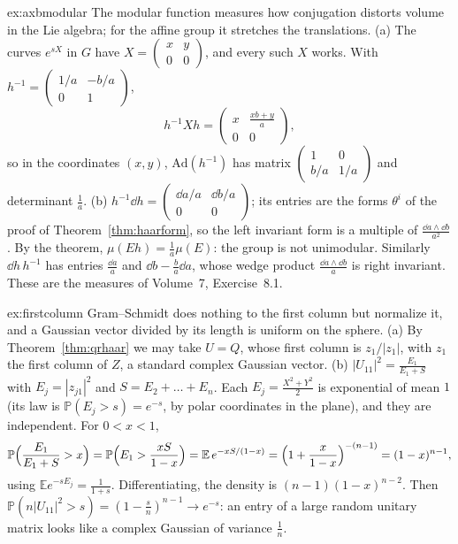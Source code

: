 \begin{solution}{ex:axbmodular}
\idea The modular function measures how conjugation distorts volume in the Lie algebra; for the affine group it stretches the translations.
\writeup (a) The curves $e^{sX}$ in $G$ have $X=\begin{pmatrix}x&y\\0&0\end{pmatrix}$, and every such $X$ works. With $h^{-1}=\begin{pmatrix}1/a&-b/a\\0&1\end{pmatrix}$,
\[h^{-1}Xh=\begin{pmatrix}x&\frac{xb+y}a\\0&0\end{pmatrix},\]
so in the coordinates $(x,y)$, $\mathrm{Ad}(h^{-1})$ has matrix $\begin{pmatrix}1&0\\b/a&1/a\end{pmatrix}$ and determinant $\frac1a$. (b) $h^{-1}\dd h=\begin{pmatrix}\dd a/a&\dd b/a\\0&0\end{pmatrix}$; its entries are the forms $\theta^i$ of the proof
of Theorem~\ref{thm:haarform}, so the left invariant form is a multiple of $\frac{\dd a\wedge\dd b}{a^2}$. By the theorem, $\mu(Eh)=\frac1a\mu(E)$: the group is not unimodular. Similarly $\dd h\,h^{-1}$ has entries
$\frac{\dd a}a$ and $\dd b-\frac ba\dd a$, whose wedge product $\frac{\dd a\wedge\dd b}a$ is right invariant. These are the measures of Volume~7, Exercise~8.1.
\end{solution}

\begin{solution}{ex:firstcolumn}
\idea Gram--Schmidt does nothing to the first column but normalize it, and a Gaussian vector divided by its length is uniform on the sphere.
\writeup (a) By Theorem~\ref{thm:qrhaar} we may take $U=Q$, whose first column is $z_1/|z_1|$, with $z_1$ the first column of $Z$, a standard complex Gaussian vector. (b) $|U_{11}|^2=\frac{E_1}{E_1+S}$ with
$E_j=|z_{j1}|^2$ and $S=E_2+\dots+E_n$. Each $E_j=\frac{X^2+Y^2}2$ is exponential of mean $1$ (its law is $\mathbb P(E_j>s)=e^{-s}$, by polar coordinates in the plane), and they are independent. For $0<x<1$,
\[\mathbb P\Bigl(\frac{E_1}{E_1+S}>x\Bigr)=\mathbb P\Bigl(E_1>\frac{xS}{1-x}\Bigr)=\mathbb E\,e^{-xS/(1-x)}=\Bigl(1+\frac x{1-x}\Bigr)^{-(n-1)}=(1-x)^{n-1},\]
using $\mathbb Ee^{-sE_j}=\frac1{1+s}$. Differentiating, the density is $(n-1)(1-x)^{n-2}$. Then $\mathbb P(n|U_{11}|^2>s)=(1-\frac sn)^{n-1}\to e^{-s}$: an entry of a large random unitary matrix looks like
a complex Gaussian of variance $\frac1n$.
\end{solution}


